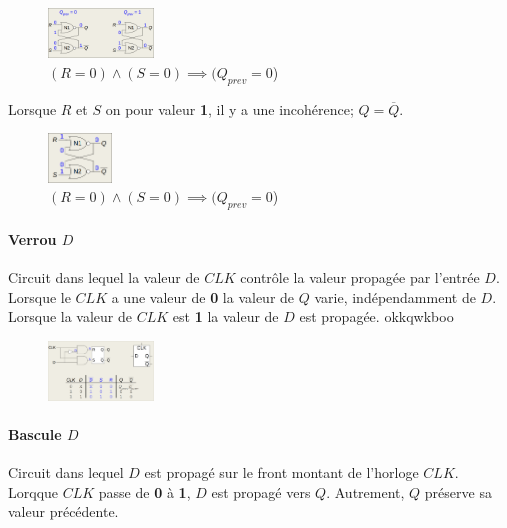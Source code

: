 \documentclass{report}
\begin{document}
\begin{multicols*}{3}
   \begin{figure}[H]
    \begin{center}
      \includegraphics[width=0.25\textwidth]{Latch3.png}
    \end{center}
    \caption{
        \tiny$(R = 0)\land(S = 0) \implies (Q_{prev} = 0$)} 
   \end{figure}


   Lorsque $R$ et $S$ on pour valeur \textbf{1}, 
   il y a une incohérence; $Q = \overline{Q}$. 


   \begin{figure}[H]
    \begin{center}
      \includegraphics[width=0.15\textwidth]{Latch4.png}
    \end{center}
    \caption{
        \tiny$(R = 0)\land(S = 0) \implies (Q_{prev} = 0$)} 
   \end{figure}


   \paragraph{Verrou $D$ }

  
   Circuit dans lequel la valeur de $CLK$ contrôle 
   la valeur propagée par l'entrée $D$. Lorsque 
   le $CLK$ a une valeur de \textbf{0} la 
   valeur de $Q$ varie, indépendamment de 
   $D$. Lorsque la valeur de $CLK$ est \textbf{1}  
   la valeur de $D$ est propagée. 
   okkqwkboo

   \begin{figure}[H]
    \begin{center}
      \includegraphics[width=0.25\textwidth]{LatchD.png}
    \end{center}
    \caption{}
   \end{figure}


   \paragraph{Bascule $D$}
   Circuit dans lequel $D$ est propagé sur le front 
   montant de l'horloge $CLK$. Lorqque $CLK$ passe 
   de \textbf{0} à \textbf{1}, $D$ est propagé 
   vers $Q$. Autrement, $Q$ préserve sa valeur précédente. 


\end{multicols*}
\end{document}
